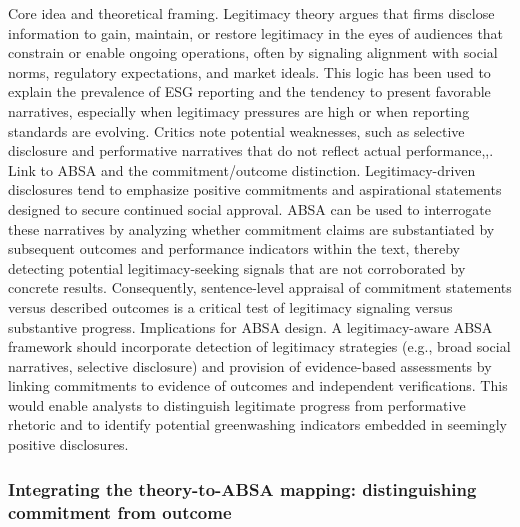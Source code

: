 Core idea and theoretical framing. Legitimacy theory argues that firms disclose information to gain, maintain, or restore legitimacy in the eyes of audiences that constrain or enable ongoing operations, often by signaling alignment with social norms, regulatory expectations, and market ideals. This logic has been used to explain the prevalence of ESG reporting and the tendency to present favorable narratives, especially when legitimacy pressures are high or when reporting standards are evolving. Critics note potential weaknesses, such as selective disclosure and performative narratives that do not reflect actual performance,,.
Link to ABSA and the commitment/outcome distinction. Legitimacy-driven disclosures tend to emphasize positive commitments and aspirational statements designed to secure continued social approval. ABSA can be used to interrogate these narratives by analyzing whether commitment claims are substantiated by subsequent outcomes and performance indicators within the text, thereby detecting potential legitimacy-seeking signals that are not corroborated by concrete results. Consequently, sentence-level appraisal of commitment statements versus described outcomes is a critical test of legitimacy signaling versus substantive progress.
Implications for ABSA design. A legitimacy-aware ABSA framework should incorporate detection of legitimacy strategies (e.g., broad social narratives, selective disclosure) and provision of evidence-based assessments by linking commitments to evidence of outcomes and independent verifications. This would enable analysts to distinguish legitimate progress from performative rhetoric and to identify potential greenwashing indicators embedded in seemingly positive disclosures.
\subsubsection{Integrating the theory-to-ABSA mapping: distinguishing commitment from outcome}

